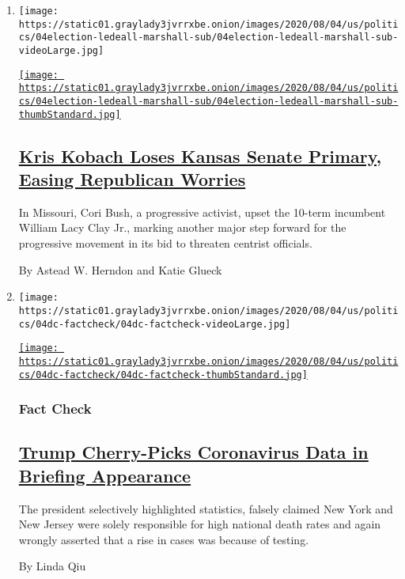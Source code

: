 \begin{enumerate}
\def\labelenumi{\arabic{enumi}.}
\item
  \texttt{[image: https://static01.graylady3jvrrxbe.onion/images/2020/08/04/us/politics/04election-ledeall-marshall-sub/04election-ledeall-marshall-sub-videoLarge.jpg]}

  \href{/2020/08/04/us/politics/kobach-tlaib.html}{\texttt{[image: https://static01.graylady3jvrrxbe.onion/images/2020/08/04/us/politics/04election-ledeall-marshall-sub/04election-ledeall-marshall-sub-thumbStandard.jpg]}}

  \hypertarget{kris-kobach-loses-kansas-senate-primary-easing-republican-worries}{%
  \subsection{\texorpdfstring{\href{/2020/08/04/us/politics/kobach-tlaib.html}{Kris
  Kobach Loses Kansas Senate Primary, Easing Republican
  Worries}}{Kris Kobach Loses Kansas Senate Primary, Easing Republican Worries}}\label{kris-kobach-loses-kansas-senate-primary-easing-republican-worries}}

  In Missouri, Cori Bush, a progressive activist, upset the 10-term
  incumbent William Lacy Clay Jr., marking another major step forward
  for the progressive movement in its bid to threaten centrist
  officials.

  By Astead W. Herndon and Katie Glueck
\item
  \texttt{[image: https://static01.graylady3jvrrxbe.onion/images/2020/08/04/us/politics/04dc-factcheck/04dc-factcheck-videoLarge.jpg]}

  \href{/2020/08/04/us/politics/coronavirus-trump-data-briefing.html}{\texttt{[image: https://static01.graylady3jvrrxbe.onion/images/2020/08/04/us/politics/04dc-factcheck/04dc-factcheck-thumbStandard.jpg]}}

  \hypertarget{fact-check}{%
  \subsubsection{Fact Check}\label{fact-check}}

  \hypertarget{trump-cherry-picks-coronavirus-data-in-briefing-appearance}{%
  \subsection{\texorpdfstring{\href{/2020/08/04/us/politics/coronavirus-trump-data-briefing.html}{Trump
  Cherry-Picks Coronavirus Data in Briefing
  Appearance}}{Trump Cherry-Picks Coronavirus Data in Briefing Appearance}}\label{trump-cherry-picks-coronavirus-data-in-briefing-appearance}}

  The president selectively highlighted statistics, falsely claimed New
  York and New Jersey were solely responsible for high national death
  rates and again wrongly asserted that a rise in cases was because of
  testing.

  By Linda Qiu
\end{enumerate}

